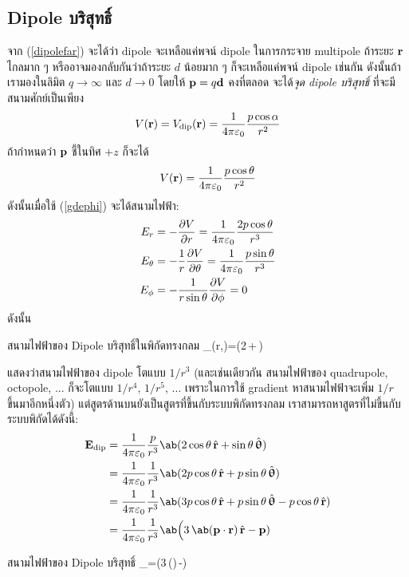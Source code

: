 \subsection{Dipole บริสุทธิ์}
จาก (\ref{dipolefar}) จะได้ว่า dipole จะเหลือแค่พจน์ dipole ในการกระจาย multipole ถ้าระยะ $\mathbf{r}$ ไกลมาก ๆ หรืออาจมองกลับกันว่าถ้าระยะ $d$ น้อยมาก ๆ ก็จะเหลือแค่พจน์ dipole เช่นกัน ดังนั้นถ้าเรามองในลิมิต $q\to\infty$ และ $d\to0$ โดยให้ $\mathbf{p}=q\mathbf{d}$ คงที่ตลอด จะได้\emph{จุด dipole บริสุทธิ์} ที่จะมีสนามศักย์เป็นเพียง
\begin{equation}
    V(\mathbf{r})=V_{\mathrm{dip}}(\mathbf{r})=\frac{1}{4\pi\varepsilon_0}\frac{p\cos\alpha}{r^2}
\end{equation}
ถ้ากำหนดว่า $\mathbf{p}$ ชี้ในทิศ $+z$ ก็จะได้
\[
V(\mathbf{r})=\frac{1}{4\pi\varepsilon_0}\frac{p\cos\theta}{r^2}
\]
ดังนั้นเมื่อใช้ (\ref{gdephi}) จะได้สนามไฟฟ้า:
\begin{align*}
    E_r&=-\pdv{V}{r}=\frac{1}{4\pi\varepsilon_0}\frac{2p\cos\theta}{r^3}\\
    E_\theta&=-\frac{1}{r}\pdv{V}{\theta}=\frac{1}{4\pi\varepsilon_0}\frac{p\sin\theta}{r^3}\\
    E_\phi&=-\frac{1}{r\sin\theta}\pdv{V}{\phi}=0
\end{align*}
ดังนั้น
\begin{eqbox}{สนามไฟฟ้าของ Dipole บริสุทธิ์ในพิกัดทรงกลม}
    _(r,\theta)=\kem{}\ab(2\cos\theta\,+\sin\theta\,\vus{\uptheta})
\end{eqbox}
แสดงว่าสนามไฟฟ้าของ dipole โตแบบ $1/r^3$ (และเช่นเดียวกัน สนามไฟฟ้าของ quadrupole, octopole, ... ก็จะโตแบบ $1/r^4$, $1/r^5$, ... เพราะในการใช้ gradient หาสนามไฟฟ้าจะเพิ่ม $1/r$ ขึ้นมาอีกหนึ่งตัว) แต่สูตรด้านบนยังเป็นสูตรที่ขึ้นกับระบบพิกัดทรงกลม เราสามารถหาสูตรที่ไม่ขึ้นกับระบบพิกัดได้ดังนี้:
\begin{align*}
    \vb{E}_\txt{dip}&=\kem\frac{p}{r^3}\ab(2\cos\theta\,\vu{r}+\sin\theta\,\vus{\uptheta})\\
    &=\kem\frac{1}{r^3}\ab(2p\cos\theta\,\vu{r}+p\sin\theta\,\vus{\uptheta})\\
    &=\kem\frac{1}{r^3}\ab(3p\cos\theta\,\vu{r}+p\sin\theta\,\vus{\uptheta}-p\cos\theta\,\vu{r})\\
    &=\kem\frac{1}{r^3}\ab\Big(3\,\ab(\vb{p}\cdot\vb{r})\,\vu{r}-\vb{p})
\end{align*}
\begin{eqbox}{สนามไฟฟ้าของ Dipole บริสุทธิ์}
    _=\kem{}\ab\Big(3\,\ab(\cdot{})\,-)
\end{eqbox}